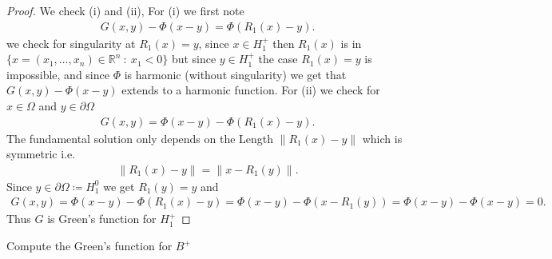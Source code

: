 \begin{proof}
 We check (i)  and (ii), For (i) we first note
 \begin{align*}
 G(x,y) - \Phi(x-y) =    \Phi(R_1(x)-y)
 .\end{align*}
 we check for singularity at $R_1(x) = y$, since $x \in  H_1^{+} $ then $R_1(x)$ is in $\{x=(x_{1},\ldots ,x_n) \in  \mathbb{R}^{n} \ : \ x_{1}<0 \}  $
 but since $y \in  H^{+}_1 $ the case $R_1(x) = y$ is impossible, and since $\Phi$ is harmonic (without singularity) we get that $G(x,y) - \Phi(x-y)$ extends to a harmonic function.
 For (ii) we check for $x \in  \Omega $ and $y \in  \partial \Omega $
 \begin{align*}
 G(x,y) = \Phi(x-y) - \Phi(R_{1}(x)-y) 
 .\end{align*}
 The fundamental solution only depends on the Length  $\|R_1(x)-y\|$ which is symmetric i.e.
 \begin{align*}
  \|R_1(x) - y\| = \|x-R_1(y)\|
 .\end{align*}
 Since $y \in  \partial \Omega  \coloneqq  H_1^{0} $  we get $R_1(y) = y$ and 
  \begin{align*}
 G(x,y) = \Phi(x-y) - \Phi(R_{1}(x)-y)  = \Phi(x-y) - \Phi(x-R_1(y))  = \Phi(x-y) - \Phi(x-y) = 0
 .\end{align*}
 Thus $G$ is Green's function for $H_1^{+} $
\end{proof}
\begin{exercise}[c]
 Compute the Green's function for $B^{+} $
\end{exercise}
